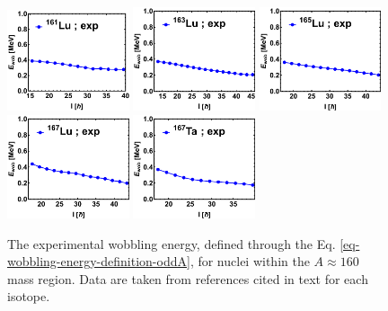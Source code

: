 \begin{figure}
    \centering
    \includegraphics[width=0.32\textwidth]{Chapters/Figures/wobblers/161Lu.pdf}
    \includegraphics[width=0.32\textwidth]{Chapters/Figures/wobblers/163Lu.pdf}
    \includegraphics[width=0.32\textwidth]{Chapters/Figures/wobblers/165Lu.pdf}
    \includegraphics[width=0.32\textwidth]{Chapters/Figures/wobblers/167Lu.pdf}
    \includegraphics[width=0.32\textwidth]{Chapters/Figures/wobblers/167Ta.pdf}
    \caption{The experimental wobbling energy, defined through the Eq. \ref{eq-wobbling-energy-definition-oddA}, for nuclei within the $A\approx 160$ mass region. Data are taken from references cited in text for each isotope.}
    \label{wobblers-exp-set3}
\end{figure}

